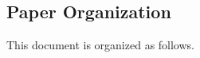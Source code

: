 % 
% 
% 
% 
% 
% 
% 







\subsection{Paper Organization}

This document is organized as follows.

